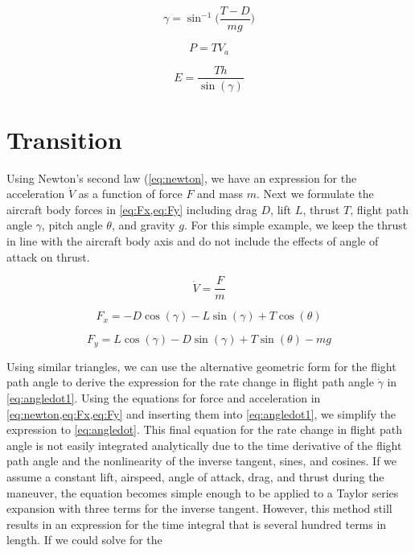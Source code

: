 \documentclass[10pt,english]{article}
\begin{document}
\begin{equation}
\label{eq:FPA}
\gamma = \sin^{-1}\Bigg(\frac{T-D}{mg}\Bigg)
\end{equation}

\begin{equation}
\label{eq:power}
P = T V_a
\end{equation}

\begin{equation}
\label{eq:energy}
E = \frac{T h }{\sin(\gamma)}
\end{equation}



\section{Transition}

Using Newton's second law (\cref{eq:newton}, we have an expression for the acceleration $\dot{V}$ as a function of force $F$ and mass $m$.  Next we formulate the aircraft body forces in \cref{eq:Fx,eq:Fy} including drag $D$, lift $L$, thrust $T$, flight path angle $\gamma$, pitch angle $\theta$, and gravity $g$.  For this simple example, we keep the thrust in line with the aircraft body axis and do not include the effects of angle of attack on thrust.  

\begin{equation}
\label{eq:newton}
\dot{V} = \frac{F}{m}
\end{equation}

\begin{equation}
\label{eq:Fx}
F_x = -D \cos(\gamma) - L \sin(\gamma) + T \cos(\theta)
\end{equation}

\begin{equation}
\label{eq:Fy}
F_y = L \cos(\gamma) - D \sin(\gamma) + T \sin(\theta) - m g
\end{equation}


Using similar triangles, we can use the alternative geometric form for the flight path angle to derive the expression for the rate change in flight path angle $\dot{\gamma}$ in \cref{eq:angledot1}.  Using the equations for force and acceleration in \cref{eq:newton,eq:Fx,eq:Fy} and inserting them into \cref{eq:angledot1}, we simplify the expression to \cref{eq:angledot}.  This final equation for the rate change in flight path angle is not easily integrated analytically due to the time derivative of the flight path angle and the nonlinearity of the inverse tangent, sines, and cosines.  If we assume a constant lift, airspeed, angle of attack, drag, and thrust during the maneuver, the equation becomes simple enough to be applied to a Taylor series expansion with three terms for the inverse tangent.  However, this method still results in an expression for the time integral that is several hundred terms in length.  If we could solve for the 
\end{document}
